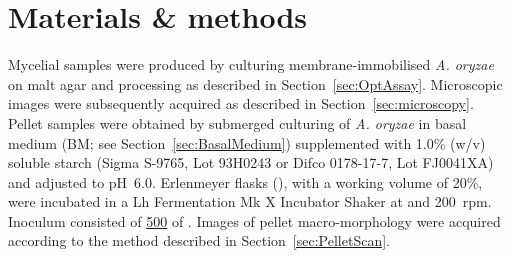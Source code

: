 \section{Materials \& methods}

Mycelial samples were produced by culturing membrane-immobilised \emph{A. oryzae} on malt agar and processing as described in Section~\ref{sec:OptAssay}. Microscopic images were subsequently acquired as described in Section~\ref{sec:microscopy}. Pellet samples were obtained by submerged culturing of \emph{A. oryzae} in basal medium (BM; see Section~\ref{sec:BasalMedium}) supplemented with 1.0\% (w/v) soluble starch (Sigma S-9765, Lot 93H0243 or Difco 0178-17-7, Lot FJ0041XA) and adjusted to pH~6.0. Erlenmeyer flasks (), with a working volume of 20\%, were incubated in a Lh Fermentation Mk X Incubator Shaker at  and 200~rpm. Inoculum consisted of \ul{500} of . Images of pellet macro-morphology were acquired according to the method described in Section~\ref{sec:PelletScan}.